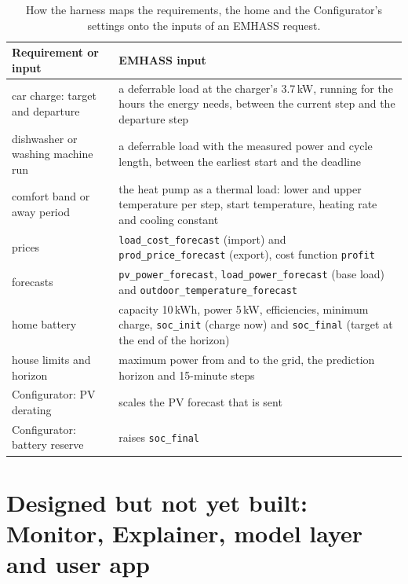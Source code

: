 \documentclass[12pt,a4paper]{report}
\begin{document}
\begin{table}[htbp]
\caption{How the harness maps the requirements, the home and the
Configurator's settings onto the inputs of an EMHASS request.}
\label{tab:emhassmap}
\small
\begin{tabularx}{\textwidth}{@{}>{\raggedright\arraybackslash}p{4.6cm}X@{}}
\toprule
Requirement or input & EMHASS input \\
\midrule
car charge: target and departure & a deferrable load at the charger's 3.7\,kW, running for the hours the energy needs, between the current step and the departure step \\
dishwasher or washing machine run & a deferrable load with the measured power and cycle length, between the earliest start and the deadline \\
comfort band or away period & the heat pump as a thermal load: lower and upper temperature per step, start temperature, heating rate and cooling constant \\
prices & \texttt{load\_cost\_forecast} (import) and \texttt{prod\_price\_forecast} (export), cost function \texttt{profit} \\
forecasts & \texttt{pv\_power\_forecast}, \texttt{load\_power\_forecast} (base load) and \texttt{outdoor\_temperature\_forecast} \\
home battery & capacity 10\,kWh, power 5\,kW, efficiencies, minimum charge, \texttt{soc\_init} (charge now) and \texttt{soc\_final} (target at the end of the horizon) \\
house limits and horizon & maximum power from and to the grid, the prediction horizon and 15-minute steps \\
Configurator: PV derating & scales the PV forecast that is sent \\
Configurator: battery reserve & raises \texttt{soc\_final} \\
\bottomrule
\end{tabularx}
\end{table}

\section{Designed but not yet built: Monitor, Explainer, model layer and user app}
\label{sec:envisioned}
\label{sec:userapp}
\end{document}
